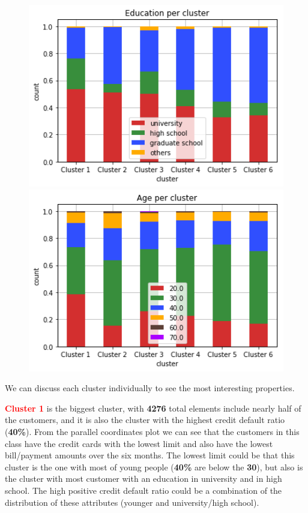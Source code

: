 \begin{figure}[h]
  \begin{minipage}[h]{.50\textwidth}
    \includegraphics[width=1\textwidth]{img/ch3/kmeans_education}
  \end{minipage}
  \begin{minipage}[h]{.50\textwidth}    
    \includegraphics[width=1\textwidth]{img/ch3/kmeans_age}
  \end{minipage}
\end{figure}

We can discuss each cluster individually to see the most interesting properties.

\smallskip

\textbf{\textcolor{red}{Cluster 1}} is the biggest cluster, with \textbf{4276} total elements include nearly half of the customers, and it is also the cluster with the highest credit default ratio (\textbf{40\%}). From the parallel coordinates plot we can see that the customers in this class have the credit cards with the lowest limit and also have the lowest bill/payment amounts over the six months. The lowest limit could be that this cluster is the one with most of young people (\textbf{40\%} are below the \textbf{30}), but also is the cluster with most customer with an education in university and in high school. The high positive credit default ratio could be a combination of the distribution of these attributes (younger and university/high school).


